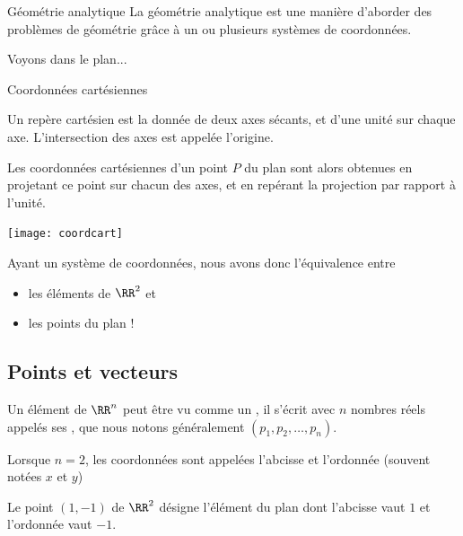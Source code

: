 \documentclass[french,xcolor=svgnames]{beamer}
\begin{document}
\begin{frame}{Géométrie analytique}%
  La géométrie analytique est une manière d'aborder des problèmes de géométrie\pause{} grâce à un ou plusieurs systèmes de coordonnées.\pause{}

  Voyons dans le plan...
\end{frame}
\begin{frame}{Coordonnées cartésiennes}%
  \begin{definition}
    Un {repère cartésien} est la donnée de deux axes sécants, et d'une unité sur chaque axe. L'intersection des axes est appelée l'origine.

    Les coordonnées cartésiennes d'un point \(P\) du plan sont alors obtenues en projetant ce point sur chacun des axes, et en repérant la projection par rapport à l'unité.
  \end{definition}
  
  \begin{center}
    \texttt{[image: coordcart]}
  \end{center}
\end{frame}
\begin{frame}%
  Ayant un système de coordonnées, nous avons donc l'équivalence entre\pause{}
  \begin{itemize}[<+->]
  \item les éléments de $\RR^{2}$ et
  \item les points du plan !
  \end{itemize}
\end{frame}

\subsection{Points et vecteurs}
\label{sec:vect-vers-points}
\begin{frame}%
  \begin{definition}
    Un élément de \(\RR^{n}\) peut être vu comme un ,\pause{} il s'écrit avec \(n\) nombres réels appelés ses ,\pause{} que nous notons généralement \((p_{1}, p_{2}, \ldots, p_{n})\).\pause{}

    Lorsque \(n = 2\), les coordonnées sont appelées\pause{} l'abcisse et\pause{} l'ordonnée\pause{} (souvent notées $x$ et $y$)
  \end{definition}\pause{}

  \begin{example}
    Le point \((1,-1)\) de \(\RR^{2}\) désigne l'élément du plan\pause{} dont l'abcisse vaut \(1\) et l'ordonnée vaut \(-1\).
  \end{example}
\end{frame}
\end{document}
